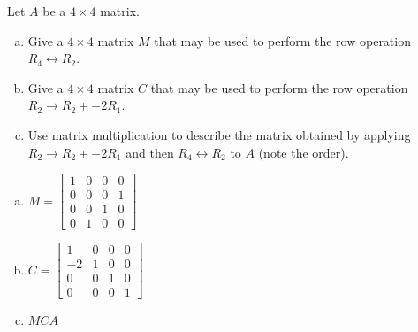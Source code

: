 
\begin{exerciseStatement}


Let \(A\) be a \(4 \times 4\) matrix.


\begin{enumerate}[(a)]
\item Give a \(4 \times 4\) matrix \(M\) that may be used to perform the row operation \( R_4 \leftrightarrow R_2 \).
\item Give a \(4 \times 4\) matrix \(C\) that may be used to perform the row operation \( R_2 \to R_2 + -2R_1 \).
\item Use matrix multiplication to describe the matrix obtained by applying \( R_2 \to R_2 + -2R_1 \) and then \( R_4 \leftrightarrow R_2 \) to \(A\) (note the order). 
\end{enumerate}
    
\end{exerciseStatement}
    
\begin{exerciseAnswer} 

\begin{enumerate}[(a)]
\item \(M= \left[\begin{array}{cccc}
1 & 0 & 0 & 0 \\
0 & 0 & 0 & 1 \\
0 & 0 & 1 & 0 \\
0 & 1 & 0 & 0
\end{array}\right] \)
\item \(C= \left[\begin{array}{cccc}
1 & 0 & 0 & 0 \\
-2 & 1 & 0 & 0 \\
0 & 0 & 1 & 0 \\
0 & 0 & 0 & 1
\end{array}\right] \)
\item \(MCA\)
\end{enumerate}
    
\end{exerciseAnswer}
    
